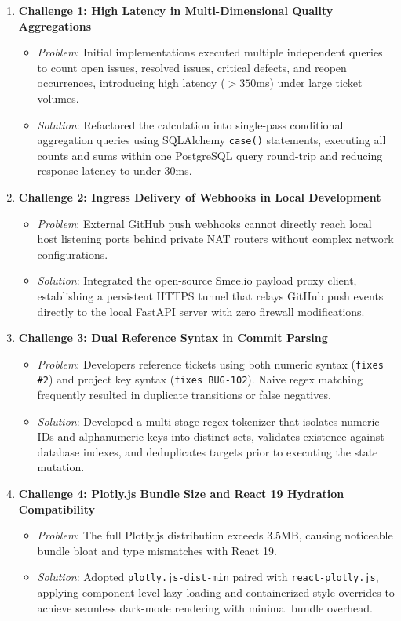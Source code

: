 \documentclass[11pt,a4paper]{article}
\begin{document}
\begin{enumerate}
    \item \textbf{Challenge 1: High Latency in Multi-Dimensional Quality Aggregations}
    \begin{itemize}
        \item \textit{Problem}: Initial implementations executed multiple independent queries to count open issues, resolved issues, critical defects, and reopen occurrences, introducing high latency ($>350$ms) under large ticket volumes.
        \item \textit{Solution}: Refactored the calculation into single-pass conditional aggregation queries using SQLAlchemy \texttt{case()} statements, executing all counts and sums within one PostgreSQL query round-trip and reducing response latency to under 30ms.
    \end{itemize}
    \item \textbf{Challenge 2: Ingress Delivery of Webhooks in Local Development}
    \begin{itemize}
        \item \textit{Problem}: External GitHub push webhooks cannot directly reach local host listening ports behind private NAT routers without complex network configurations.
        \item \textit{Solution}: Integrated the open-source Smee.io payload proxy client, establishing a persistent HTTPS tunnel that relays GitHub push events directly to the local FastAPI server with zero firewall modifications.
    \end{itemize}
    \item \textbf{Challenge 3: Dual Reference Syntax in Commit Parsing}
    \begin{itemize}
        \item \textit{Problem}: Developers reference tickets using both numeric syntax (\texttt{fixes \#2}) and project key syntax (\texttt{fixes BUG-102}). Naive regex matching frequently resulted in duplicate transitions or false negatives.
        \item \textit{Solution}: Developed a multi-stage regex tokenizer that isolates numeric IDs and alphanumeric keys into distinct sets, validates existence against database indexes, and deduplicates targets prior to executing the state mutation.
    \end{itemize}
    \item \textbf{Challenge 4: Plotly.js Bundle Size and React 19 Hydration Compatibility}
    \begin{itemize}
        \item \textit{Problem}: The full Plotly.js distribution exceeds 3.5MB, causing noticeable bundle bloat and type mismatches with React 19.
        \item \textit{Solution}: Adopted \texttt{plotly.js-dist-min} paired with \texttt{react-plotly.js}, applying component-level lazy loading and containerized style overrides to achieve seamless dark-mode rendering with minimal bundle overhead.
    \end{itemize}
\end{enumerate}
\end{document}
